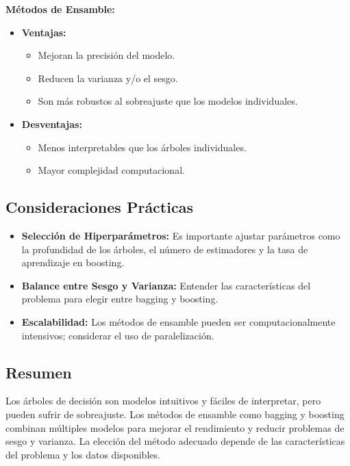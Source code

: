 \documentclass[a4paper, 11pt]{article}
\begin{document}
\textbf{Métodos de Ensamble:}

\begin{itemize}
    \item \textbf{Ventajas:}
    \begin{itemize}
        \item Mejoran la precisión del modelo.
        \item Reducen la varianza y/o el sesgo.
        \item Son más robustos al sobreajuste que los modelos individuales.
    \end{itemize}
    \item \textbf{Desventajas:}
    \begin{itemize}
        \item Menos interpretables que los árboles individuales.
        \item Mayor complejidad computacional.
    \end{itemize}
\end{itemize}

\subsection{Consideraciones Prácticas}

\begin{itemize}
    \item \textbf{Selección de Hiperparámetros:} Es importante ajustar parámetros como la profundidad de los árboles, el número de estimadores y la tasa de aprendizaje en boosting.
    \item \textbf{Balance entre Sesgo y Varianza:} Entender las características del problema para elegir entre bagging y boosting.
    \item \textbf{Escalabilidad:} Los métodos de ensamble pueden ser computacionalmente intensivos; considerar el uso de paralelización.
\end{itemize}

\subsection{Resumen}

Los árboles de decisión son modelos intuitivos y fáciles de interpretar, pero pueden sufrir de sobreajuste. Los métodos de ensamble como bagging y boosting combinan múltiples modelos para mejorar el rendimiento y reducir problemas de sesgo y varianza. La elección del método adecuado depende de las características del problema y los datos disponibles.
\end{document}
